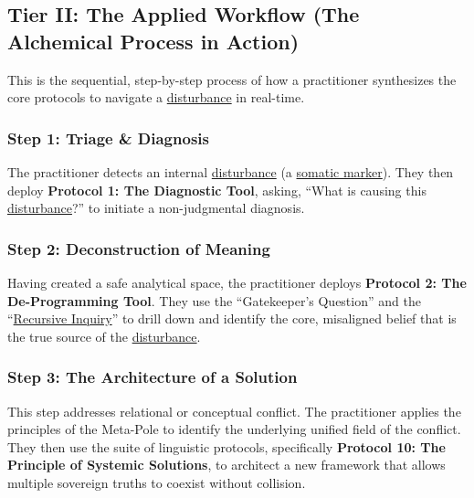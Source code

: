 \documentclass{article}
\begin{document}
\subsection*{Tier II: The Applied Workflow (The Alchemical Process in Action)}

This is the sequential, step-by-step process of how a practitioner synthesizes the core protocols to navigate a \hyperlink{gloss:disturbance}{disturbance} in real-time.

\subsubsection*{Step 1: Triage \& Diagnosis}
The practitioner detects an internal \hyperlink{gloss:disturbance}{disturbance} (a \hyperlink{gloss:somatic_marker}{somatic marker}). They then deploy \textbf{Protocol 1: The Diagnostic Tool}, asking, ``What is causing this \hyperlink{gloss:disturbance}{disturbance}?'' to initiate a non-judgmental diagnosis.

\subsubsection*{Step 2: Deconstruction of Meaning}
Having created a safe analytical space, the practitioner deploys \textbf{Protocol 2: The De-Programming Tool}. They use the ``Gatekeeper's Question'' and the ``\hyperlink{gloss:recursive_inquiry}{Recursive Inquiry}'' to drill down and identify the core, misaligned belief that is the true source of the \hyperlink{gloss:disturbance}{disturbance}.

\subsubsection*{Step 3: The Architecture of a Solution}
This step addresses relational or conceptual conflict. The practitioner applies the principles of the Meta-Pole to identify the underlying unified field of the conflict. They then use the suite of linguistic protocols, specifically \textbf{Protocol 10: The Principle of Systemic Solutions}, to architect a new framework that allows multiple sovereign truths to coexist without collision.
\end{document}
